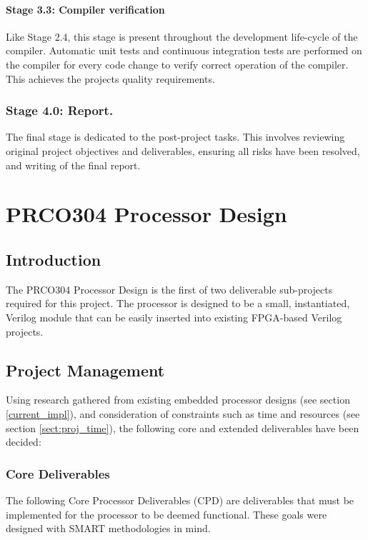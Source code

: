 \documentclass[11pt,a4paper]{report}
\newcommand{\scname}{PRCO304}
\begin{document}
\subsubsection*{Stage 3.3: Compiler verification}
Like Stage 2.4, this stage is present throughout the development life-cycle of the compiler. Automatic unit tests and continuous integration tests are performed on the compiler for every code change to verify correct operation of the compiler. This achieves the projects quality requirements.

\subsection*{Stage 4.0: Report.}
The final stage is dedicated to the post-project tasks. This involves reviewing original project objectives and deliverables, ensuring all risks have been resolved, and writing of the final report. 



\chapter{\scname{} Processor Design}
\label{core}
{\hypersetup{linkcolor=black}
\startcontents[chapters]
}


\section{Introduction}
The \scname{} Processor Design is the first of two deliverable sub-projects required for this project. The processor is designed to be a small, instantiated, Verilog module that can be easily inserted into existing FPGA-based Verilog projects.



\newpage
\section{Project Management}
Using research gathered from existing embedded processor designs (see section \ref{current_impl}), and consideration of constraints such as time and resources (see section \ref{sect:proj_time}), the following core and extended deliverables have been decided:

\subsection{Core Deliverables}
The following Core Processor Deliverables (CPD) are deliverables that must be implemented for the processor to be deemed functional. These goals were designed with SMART methodologies in mind.
\end{document}
